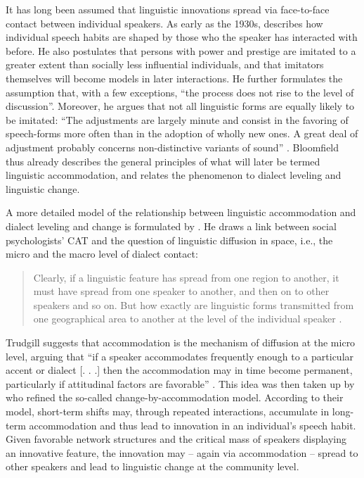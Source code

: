 \documentclass[output=paper]{langscibook}
\begin{document}
It has long been assumed that linguistic innovations spread via face-to-face contact between individual speakers. As early as the 1930s, \citet[476--477]{bloomfield_language_1933} describes how individual speech habits are shaped by those who the speaker has interacted with before. He also postulates that persons with power and prestige are imitated to a greater extent than socially less influential individuals, and that imitators themselves will become models in later interactions. He further formulates the assumption that, with a few exceptions, ``the process does not rise to the level of discussion''. Moreover, he argues that not all linguistic forms are equally likely to be imitated: ``The adjustments are largely minute and consist in the favoring of speech-forms more often than in the adoption of wholly new ones. A great deal of adjustment probably concerns non-distinctive variants of sound'' \citep[476--477]{bloomfield_language_1933}. Bloomfield thus already describes the general principles of what will later be termed linguistic accommodation, and relates the phenomenon to dialect leveling and linguistic change. 

A more detailed model of the relationship between linguistic accommodation and dialect leveling and change is formulated by \textcite{trudgill_dialects_1986}. He draws a link between social psychologists’ CAT and the question of linguistic diffusion in space, i.e., the micro and the macro level of dialect contact: 

\begin{quote}
Clearly, if a linguistic feature has spread from one region to another, it must have spread from one speaker to another, and then on to other speakers and so on. But how exactly are linguistic forms transmitted from one geographical area to another at the level of the individual speaker \citep[39]{trudgill_dialects_1986}. 
\end{quote}

Trudgill suggests that accommodation is the mechanism of diffusion at the micro level, arguing that ``if a speaker accommodates frequently enough to a particular accent or dialect [. . .] then the accommodation may in time become permanent, particularly if attitudinal factors are favorable'' \citep[39]{trudgill_dialects_1986}. This idea was then taken up by \textcite{auer_role_2005} who refined the so-called change-by-accommodation model. According to their model, short-term shifts may, through repeated interactions, accumulate in long-term accommodation and thus lead to innovation in an individual's speech habit. Given favorable network structures and the critical mass of speakers displaying an innovative feature, the innovation may – again via accommodation – spread to other speakers and lead to linguistic change at the community level. 
\end{document}
